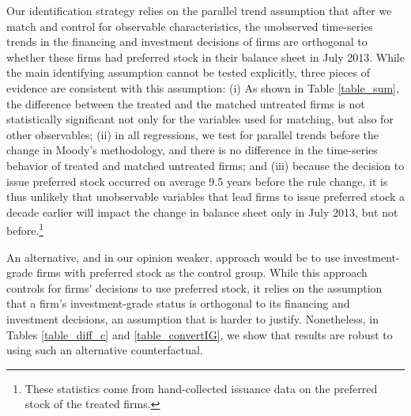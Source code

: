 \documentclass[a4paper, 12pt]{article}
\begin{document}
Our identification strategy relies on the parallel trend assumption that after we match and control for observable characteristics, the unobserved time-series trends in the financing and investment decisions of firms are orthogonal to whether these firms had preferred stock in their balance sheet in July 2013. While the main identifying assumption cannot be tested explicitly, three pieces of evidence are consistent with this assumption: (i) As shown in Table \ref{table_sum}, the difference between the treated and the matched untreated firms is not statistically significant not only for the variables used for matching, but also for other observables; (ii) in all regressions, we test for parallel trends before the change in Moody's methodology, and there is no difference in the time-series behavior of treated and matched untreated firms; and (iii) because the decision to issue preferred stock occurred on average 9.5 years before the rule change, it is thus unlikely that unobservable variables that lead firms to issue preferred stock a decade earlier will impact the change in balance sheet only in July 2013, but not before.\footnote{These statistics come from hand-collected issuance data on the preferred stock of the treated firms.}


An alternative, and in our opinion weaker, approach would be to use investment-grade firms with preferred stock as the control group. While this approach controls for firms' decisions to use preferred stock, it relies on the assumption that a firm's investment-grade status is orthogonal to its financing and investment decisions, an assumption that is harder to justify. Nonetheless, in Tables \ref{table_diff_c} and \ref{table_convertIG}, we show that results are robust to using such an alternative counterfactual.
\end{document}
